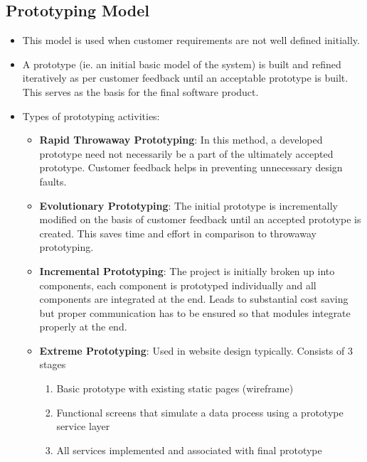 \documentclass{article}
\begin{document}
\subsection{Prototyping Model}
\begin{itemize}
    \item This model is used when customer requirements are not well defined initially. 
    
    \item A prototype (ie. an initial basic model of the system) is built and refined iteratively as per customer feedback until an acceptable prototype is built. This serves as the basis for the final software product. 
    
    \item Types of prototyping activities:
    \begin{itemize}
        \item \textbf{Rapid Throwaway Prototyping}: In this method, a developed prototype need not necessarily be a part of the ultimately accepted prototype. Customer feedback helps in preventing unnecessary design faults.
        
        \item \textbf{Evolutionary Prototyping}: The initial prototype is incrementally modified on the basis of customer feedback until an accepted prototype is created. This saves time and effort in comparison to throwaway prototyping. 
        
        \item \textbf{Incremental Prototyping}: The project is initially broken up into components, each component is prototyped individually and all components are integrated at the end. Leads to substantial cost saving but proper communication has to be ensured so that modules integrate properly at the end. 
        
        \item \textbf{Extreme Prototyping}: Used in website design typically. Consists of 3 stages \begin{enumerate}
            \item Basic prototype with existing static pages (wireframe) 
            
            \item Functional screens that simulate a data process using a prototype service layer
            
            \item All services implemented and associated with final prototype
        \end{enumerate}
    \end{itemize}
\end{itemize}
\end{document}
